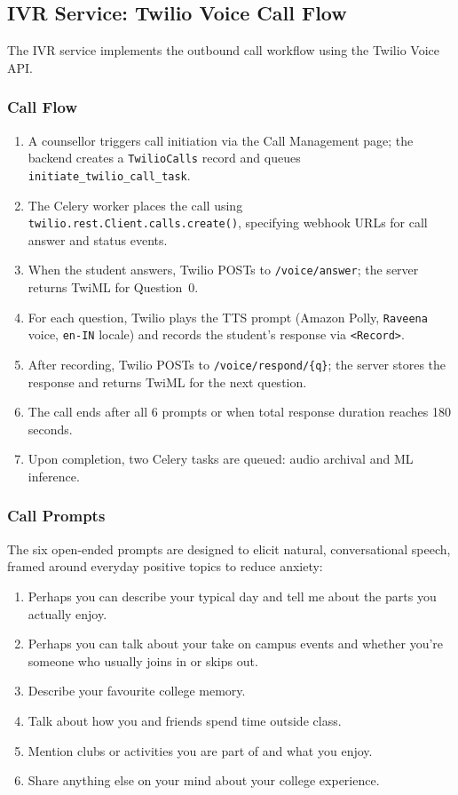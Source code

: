 \subsection{IVR Service: Twilio Voice Call Flow}

The IVR service implements the outbound call workflow using the Twilio Voice API.

\subsubsection{Call Flow}

\begin{enumerate}
    \item A counsellor triggers call initiation via the Call Management page; the backend creates a \texttt{TwilioCalls} record and queues \texttt{initiate\_twilio\_call\_task}.
    \item The Celery worker places the call using \texttt{twilio.rest.\allowbreak Client.calls.\allowbreak create()}, specifying webhook URLs for call answer and status events.
    \item When the student answers, Twilio POSTs to \texttt{/voice/answer}; the server returns TwiML for Question~0.
    \item For each question, Twilio plays the TTS prompt (Amazon Polly, \texttt{Raveena} voice, \texttt{en-IN} locale) and records the student's response via \texttt{<Record>}.
    \item After recording, Twilio POSTs to \texttt{/voice/respond/\{q\}}; the server stores the response and returns TwiML for the next question.
    \item The call ends after all 6 prompts or when total response duration reaches 180 seconds.
    \item Upon completion, two Celery tasks are queued: audio archival and ML inference.
\end{enumerate}

\subsubsection{Call Prompts}

The six open-ended prompts are designed to elicit natural, conversational speech, framed around everyday positive topics to reduce anxiety:
\begin{enumerate}
    \item Perhaps you can describe your typical day and tell me about the parts you actually enjoy.
    \item Perhaps you can talk about your take on campus events and whether you're someone who usually joins in or skips out.
    \item Describe your favourite college memory.
    \item Talk about how you and friends spend time outside class.
    \item Mention clubs or activities you are part of and what you enjoy.
    \item Share anything else on your mind about your college experience.
\end{enumerate}

